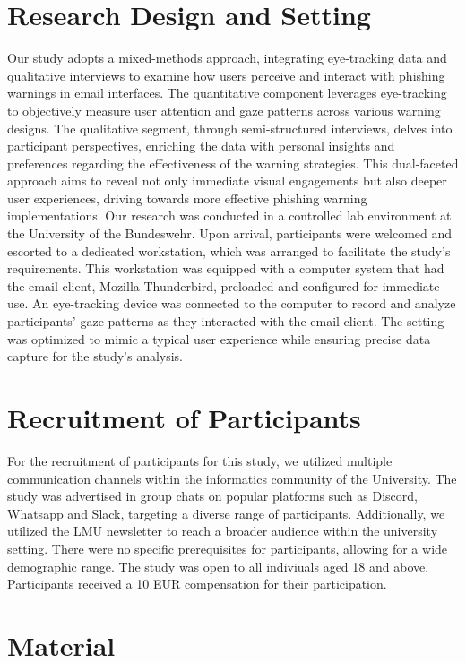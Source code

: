 \documentclass[
  a4paper,  %
  twoside,  %
  bibliography=totoc,
  headsepline,
  cleardoublepage=empty,
  parskip=half,
  draft=false
]{scrbook}
\begin{document}
\section{Research Design and Setting}
Our study adopts a mixed-methods approach, integrating eye-tracking data and qualitative interviews to examine how users perceive and interact with phishing warnings in email interfaces. The quantitative component leverages eye-tracking to objectively measure user attention and gaze patterns across various warning designs. The qualitative segment, through semi-structured interviews, delves into participant perspectives, enriching the data with personal insights and preferences regarding the effectiveness of the warning strategies. This dual-faceted approach aims to reveal not only immediate visual engagements but also deeper user experiences, driving towards more effective phishing warning implementations. \newline
Our research was conducted in a controlled lab environment at the University of the Bundeswehr. Upon arrival, participants were welcomed and escorted to a dedicated workstation, which was arranged to facilitate the study's requirements. This workstation was equipped with a computer system that had the email client, Mozilla Thunderbird, preloaded and configured for immediate use. An eye-tracking device was connected to the computer to record and analyze participants' gaze patterns as they interacted with the email client. The setting was optimized to mimic a typical user experience while ensuring precise data capture for the study's analysis.

\section{Recruitment of Participants}
For the recruitment of participants for this study, we utilized multiple communication channels within the informatics community of the University. The study was advertised in group chats on popular platforms such as Discord, Whatsapp and Slack, targeting a diverse range of participants. Additionally, we utilized the LMU newsletter to reach a broader audience within the university setting. There were no specific prerequisites for participants, allowing for a wide demographic range. The study was open to all indiviuals aged 18 and above. Participants received a 10 EUR compensation for their participation.

\section{Material}
\end{document}
